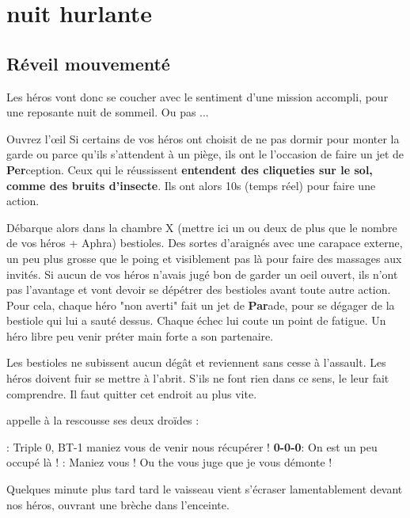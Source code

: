 \section{nuit hurlante}

\subsection{Réveil mouvementé}

Les héros vont donc se coucher avec le sentiment d’une mission accompli, pour une reposante nuit de sommeil. Ou pas ...

\begin{paperbox}{Ouvrez l’œil}
Si certains de vos héros ont choisit de ne pas dormir pour monter la garde ou parce qu’ils s’attendent à un piège, ils ont le l’occasion de faire un jet de \textbf{Per}ception. Ceux qui le réussissent \textbf{entendent des cliqueties sur le sol, comme des bruits d’insecte}. Ils ont alors 10s (temps réel) pour faire une action.
\end{paperbox}

Débarque alors dans la chambre X (mettre ici un ou deux de plus que le nombre de vos héros + Aphra) bestioles. Des sortes d’araignés avec une carapace externe, un peu plus grosse que le poing et visiblement pas là pour faire des massages aux invités. Si aucun de vos héros n’avais jugé bon de garder un oeil ouvert, ils n’ont pas l’avantage et vont devoir se dépétrer des bestioles avant toute autre action. Pour cela, chaque héro "non averti" fait un jet de \textbf{Par}ade, pour se dégager de la bestiole qui lui a sauté dessus. Chaque échec lui coute un point de fatigue. Un héro libre peu venir préter main forte a son partenaire.

Les bestioles ne subissent aucun dégât et reviennent sans cesse à l’assault. Les héros doivent fuir se mettre à l’abrit. S’ils ne font rien dans ce sens,  le leur fait comprendre. Il faut quitter cet endroit au plus vite.

 appelle à la rescousse ses deux droïdes :

\begin{quotebox}
\noindent\textbf{}: Triple 0, BT-1 maniez vous de venir nous récupérer !
\noindent\textbf{0-0-0}: On est un peu occupé là !
\noindent\textbf{}: Maniez vous ! Ou the vous juge que je vous démonte !
\end{quotebox}

Quelques minute plus tard tard le vaisseau vient s’écraser lamentablement devant nos héros, ouvrant une brèche dans l’enceinte. 

